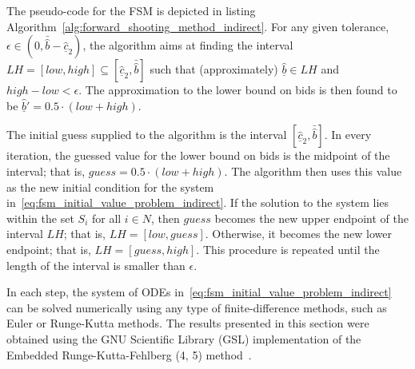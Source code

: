 The pseudo-code for the FSM is depicted in listing Algorithm~\ref{alg:forward_shooting_method_indirect}. For any given tolerance, $\epsilon\in\left(0, \bar{\hat{b}} - \underline{\hat{c}}_2\right)$, the algorithm aims at finding the interval $LH=[low, high]\subseteq [\underline{\hat{c}}_2, \bar{\hat{b}}]$ such that (approximately) $\underline{\hat{b}}\in LH$ and $high-low < \epsilon$. The approximation to the lower bound on bids is then found to be $\underline{\hat{b}}' = 0.5\cdot(low + high)$.

The initial guess supplied to the algorithm is the interval $[\underline{\hat{c}}_2, \bar{\hat{b}}]$. In every iteration, the guessed value for the lower bound on bids is the midpoint of the interval; that is, $guess = 0.5\cdot(low + high)$. The algorithm then uses this value as the new initial condition for the system in~\eqref{eq:fsm_initial_value_problem_indirect}. If the solution to the system lies within the set $S_i$ for all $i\in N$, then $guess$ becomes the new upper endpoint of the interval $LH$; that is, $LH = [low, guess]$. Otherwise, it becomes the new lower endpoint; that is, $LH = [guess, high]$. This procedure is repeated until the length of the interval is smaller than $\epsilon$.

In each step, the system of ODEs in~\eqref{eq:fsm_initial_value_problem_indirect} can be solved numerically using any type of finite-difference methods, such as Euler or Runge-Kutta methods. The results presented in this section were obtained using the GNU Scientific Library (GSL) implementation of the Embedded Runge-Kutta-Fehlberg (4, 5) method~\cite{GSL}.

